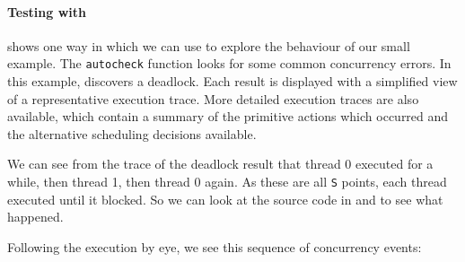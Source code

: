 \paragraph{Testing with \dejafu{}}
 shows one way in which we can use
\dejafu{} to explore the behaviour of our small example.  The
\verb|autocheck| function looks for some common concurrency errors.
In this example, \dejafu{} discovers a deadlock.  Each result is
displayed with a simplified view of a representative execution trace.
More detailed execution traces are also available, which contain a
summary of the primitive actions which occurred and the alternative
scheduling decisions available.

We can see from the trace of the deadlock result that thread 0
executed for a while, then thread 1, then thread 0 again.  As these
are all \verb|S| points, each thread executed until it blocked.  So we
can look at the source code in  and
 to see what happened.

Following the execution by eye, we see this sequence of concurrency
events:

